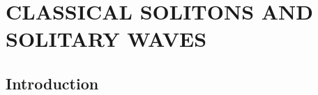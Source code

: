 \documentclass[dvipdfmx,11pt,a4paper]{jsbook}
\begin{document}


\makeatletter
{}
\def\theequation{\thesection.\arabic{equation}}
\makeatother



\chapter{CLASSICAL SOLITONS AND SOLITARY WAVES}
\section{Introduction}
\end{document}
